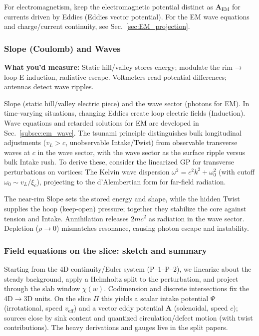 For electromagnetism, keep the electromagnetic potential distinct as $\mathbf A_{\text{EM}}$ for currents driven by Eddies (Eddies vector potential). For the EM wave equations and charge/current continuity, see Sec.~\ref{sec:EM_projection}.

\subsubsection{Slope (Coulomb) and Waves}

\textbf{What you'd measure:} Static hill/valley stores energy; modulate the rim → loop-E induction, radiative escape. Voltmeters read potential differences; antennas detect wave ripples.

Slope (static hill/valley electric piece) and the wave sector (photons for EM). In time-varying situations, changing Eddies create loop electric fields (Induction). Wave equations and retarded solutions for EM are developed in Sec.~\ref{subsec:em_wave}. The tsunami principle distinguishes bulk longitudinal adjustments ($v_L > c$, unobservable Intake/Twist) from observable transverse waves at $c$ in the wave sector, with the wave sector as the surface ripple versus bulk Intake rush. To derive these, consider the linearized GP for transverse perturbations on vortices: The Kelvin wave dispersion $\omega^2 = c^2 k^2 + \omega_0^2$ (with cutoff $\omega_0 \sim v_L / \xi_c$), projecting to the d'Alembertian form for far-field radiation.

The near-rim Slope sets the stored energy and shape, while the hidden Twist supplies the hoop (keep-open) pressure; together they stabilize the core against tension and Intake. Annihilation releases $2mc^2$ as radiation in the wave sector. Depletion ($\rho \to 0$) mismatches resonance, causing photon escape and instability.

\subsubsection{Field equations on the slice: sketch and summary}
\label{sec:field-eqs-framework}

Starting from the 4D continuity/Euler system (P–1–P–2), we linearize about the steady background, apply a Helmholtz split to the perturbation, and project through the slab window $\chi(w)$. Codimension and discrete intersections fix the 4D$\!\to$3D units. On the slice $\Pi$ this yields a scalar intake potential $\Psi$ (irrotational, speed $v_{\text{eff}}$) and a vector eddy potential $\mathbf A$ (solenoidal, speed $c$); sources close by sink content and quantized circulation/defect motion (with twist contributions). The heavy derivations and gauges live in the split papers.

